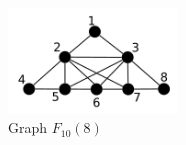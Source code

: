  \begin{figure}[htb]	
 \center%
 \includegraphics[width=4.5cm]{./img/ktent.png}
 \caption{Graph $F_{10}(8)$}
\label{fig:ktent}
\end{figure}  
 
